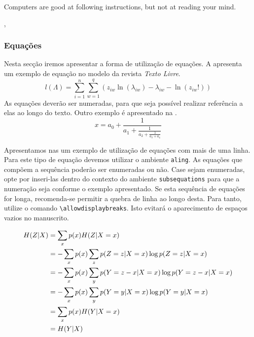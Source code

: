 \documentclass{textolivre}
\begin{document}
\epigraph{Computers are good at following instructions, but not at reading your mind.}{, \emph{}}



\subsubsection{Equações}\label{sec-equacao}
Nesta secção iremos apresentar a forma de utilização de equações. A  apresenta um
exemplo de equação no modelo da revista \emph{Texto Livre}.
\begin{equation}
l(\Lambda)=\sum_{i=1}^{n} \sum_{w=1}^{q} (z_{i w} \ln (\lambda_{i w}) - \lambda_{i w} - \ln (z_{i w}!))
\label{eq-poisson}
\end{equation}
As equações deverão ser numeradas, para que seja possível realizar referência a elas ao longo do texto.
Outro exemplo é apresentado na .
\begin{equation}
  x = a_0 + \frac{1}{\displaystyle a_1 
          + \frac{1}{\displaystyle a_2 
          + \frac{1}{\displaystyle a_3 + a_4}}}
\label{eq-frac}
\end{equation}

Apresentamos nas  um exemplo de utilização de equações com mais de uma linha. 
Para este tipo de equação devemos utilizar o ambiente \texttt{aling}. 
As equações que compõem a sequência poderão ser enumeradas ou não. Case sejam enumeradas, opte por inseri-las dentro do contexto do ambiente 
\texttt{subsequations} para que a numeração seja conforme o exemplo apresentado.
Se esta sequência de equações for longa, recomenda-se permitir a quebra de linha ao longo desta. 
Para tanto, utilize o comando \verb|\allowdisplaybreaks|. Isto evitará o aparecimento de espaços vazios 
no manuscrito.

\begin{subequations}
\allowdisplaybreaks
\begin{align}
H(Z|X) &= \sum_x p(x) H(Z|X=x) \label{eq-align-ex1} \\
       &= - \sum_x p(x) \sum_z p(Z=z|X=x) \log p(Z=z|X=x) \label{eq-align-ex2}\\
       &= - \sum_x p(x) \sum_y p(Y=z-x|X=x) \log p(Y=z-x|X=x) \label{eq-align-ex3} \\
       &= - \sum_x p(x) \sum_y p(Y=y|X=x) \log p(Y=y|X=x) \label{eq-align-ex4} \\
       &= \sum_x p(x) H(Y|X=x) \label{eq-align-ex5} \\
       &= H(Y|X) \label{eq-align-ex6}
\end{align}
\end{subequations}
\end{document}
